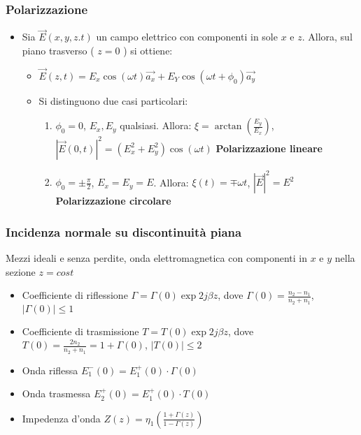 \documentclass{article}
\begin{document}
\subsubsection{Polarizzazione}
\begin{itemize}
	\item Sia \( \vec{E}(x, y, z. t) \) un campo elettrico con componenti in sole \( x \) e \( z \). Allora, sul piano trasverso ( \( z = 0 \) ) si ottiene:
	\begin{itemize}
		\item \( \vec{E}(z, t) = E_x \cos ( \omega t) \vec{a_x} + E_Y \cos( \omega t + \phi_0) \vec{a_y}  \)
		\item Si distinguono due casi particolari:
		\begin{enumerate}
			\item \( \phi_0 = 0 \), \( E_x, E_y \) qualsiasi. Allora: \( \xi  = \arctan(\frac{E_y}{E_x}) \), \( |\vec{E}(0, t)|^2 = (E_x^2 + E_y^2) \cos(\omega t) \) \textbf{Polarizzazione lineare}
			\item  \( \phi_0 = \pm \frac{\pi}{2} \), \( E_x = E_y = E \). Allora: \( \xi(t)  = \mp \omega t \), \( |\vec{E}|^2 = E^2 \) \textbf{Polarizzazione circolare}
		\end{enumerate}
	\end{itemize}	  
\end{itemize}


\subsubsection{Incidenza normale su discontinuità piana}
Mezzi ideali e senza perdite, onda elettromagnetica con componenti in \( x \) e \( y \) nella sezione \( z = cost \)
\begin{itemize}
	\item Coefficiente di riflessione \( \Gamma = \Gamma(0) \exp{2 j \beta z}  \), dove \( \Gamma(0) = \frac{n_2 - n_1}{n_2 + n_1}\), \( | \Gamma(0) | \leq 1 \)
	\item Coefficiente di trasmissione \( T = T(0) \exp{2 j \beta z}  \), dove \( T(0) = \frac{2 n_2}{n_2 + n_1} = 1 + \Gamma(0)\), \( | T(0) | \leq 2 \)
	\item Onda riflessa \( E_1^-(0) =  E_1^+(0) \cdot \Gamma (0) \)
	\item Onda trasmessa \( E_2^+(0) =  E_1^+(0) \cdot T (0) \)
	\item Impedenza d'onda \( Z(z) = \eta_1 (\frac{1 + \Gamma(z)}{1 - \Gamma(z)}) \)
\end{itemize}
\end{document}
